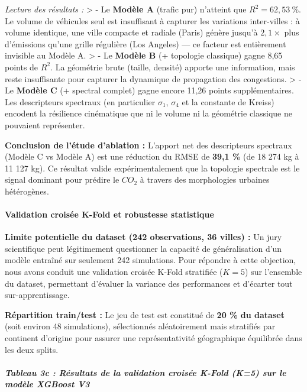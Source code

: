 \documentclass[10pt, a4paper]{article}
\begin{document}
\emph{Lecture des résultats :} \textgreater{} - Le \textbf{Modèle A}
(trafic pur) n'atteint que \(R^2 = 62{,}53\ \%\). Le volume de véhicules
seul est insuffisant à capturer les variations inter-villes : à volume
identique, une ville compacte et radiale (Paris) génère jusqu'à
\(2{,}1\times\) plus d'émissions qu'une grille régulière (Los Angeles)
--- ce facteur est entièrement invisible au Modèle A. \textgreater{} -
Le \textbf{Modèle B} (+ topologie classique) gagne 8,65 points de
\(R^2\). La géométrie brute (taille, densité) apporte une information,
mais reste insuffisante pour capturer la dynamique de propagation des
congestions. \textgreater{} - Le \textbf{Modèle C} (+ spectral complet)
gagne encore 11,26 points supplémentaires. Les descripteurs spectraux
(en particulier \(\sigma_1\), \(\sigma_4\) et la constante de Kreiss)
encodent la résilience cinématique que ni le volume ni la géométrie
classique ne pouvaient représenter.

\textbf{Conclusion de l'étude d'ablation :} L'apport net des
descripteurs spectraux (Modèle C vs Modèle A) est une réduction du RMSE
de \textbf{39,1 \%} (de 18 274 kg à 11 127 kg). Ce résultat valide
expérimentalement que la topologie spectrale est le signal dominant pour
prédire le \(CO_2\) à travers des morphologies urbaines hétérogènes.

\paragraph{Validation croisée K-Fold et robustesse
statistique}\label{validation-croisuxe9e-k-fold-et-robustesse-statistique}

\textbf{Limite potentielle du dataset (242 observations, 36 villes) :}
Un jury scientifique peut légitimement questionner la capacité de
généralisation d'un modèle entraîné sur seulement 242 simulations. Pour
répondre à cette objection, nous avons conduit une validation croisée
K-Fold stratifiée (\(K=5\)) sur l'ensemble du dataset, permettant
d'évaluer la variance des performances et d'écarter tout
sur-apprentissage.

\textbf{Répartition train/test :} Le jeu de test est constitué de
\textbf{20 \% du dataset} (soit environ 48 simulations), sélectionnés
aléatoirement mais stratifiés par continent d'origine pour assurer une
représentativité géographique équilibrée dans les deux splits.

\subparagraph{Tableau 3c : Résultats de la validation croisée K-Fold
(K=5) sur le modèle XGBoost
V3}\label{tableau-3c-ruxe9sultats-de-la-validation-croisuxe9e-k-fold-k5-sur-le-moduxe8le-xgboost-v3}
\end{document}
